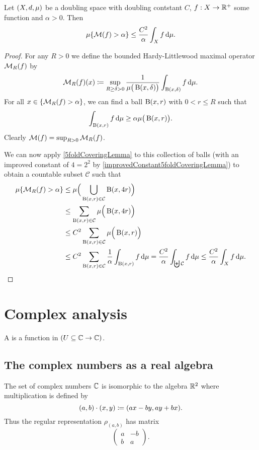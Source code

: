 \begin{proposition}
Let $\left( X,d, \mu \right)$ be a doubling space with doubling contstant $C$, $f: X\to \mathbb{R}^+$ some function and $\alpha > 0$. Then
\[ \mu\{\operatorname{\mathcal{M}}(f) > \alpha\} \leq \frac{C^2}{\alpha}\int_{X}f\operatorname{d \!}{\mu}. \]
\end{proposition}
\begin{proof}
For any $R>0$ we define the bounded Hardy-Littlewood maximal operator $\operatorname{\mathcal{M}}_R(f)$ by
\[ \operatorname{\mathcal{M}}_R(f)(x) \coloneqq \sup_{R\geq\delta >0}\frac{1}{\mu\big(\operatorname{B}(x,\delta)\big)}\int_{\operatorname{B}(x,\delta)} f \operatorname{d \!}{\mu}. \]
For all $x\in \{\operatorname{\mathcal{M}}_R(f) > \alpha\}$, we can find a ball $\operatorname{B}(x,r)$ with $0<r\leq R$ such that
\[ \int_{\operatorname{B}(x,r)}f \operatorname{d \!}{\mu} \geq \alpha\mu\big(\operatorname{B}(x,r)\big). \]
Clearly $\operatorname{\mathcal{M}}(f) = \sup_{R>0}\operatorname{\mathcal{M}}_R(f)$.

We can now apply \ref{5foldCoveringLemma} to this collection of balls (with an improved constant of $4 = 2^2$ by \ref{improvedConstant5foldCoveringLemma}) to obtain a countable subset $\mathcal{C}$ such that
\begin{align*}
\mu\{\operatorname{\mathcal{M}}_R(f) > \alpha\} &\leq \mu\Big(\bigcup_{\operatorname{B}(x,r)\in \mathcal{C}}\operatorname{B}(x,4r)\Big) \\
&\leq \sum_{\operatorname{B}(x,r)\in \mathcal{C}}\mu\Big(\operatorname{B}(x,4r)\Big) \\
&\leq C^2\sum_{\operatorname{B}(x,r)\in \mathcal{C}}\mu\Big(\operatorname{B}(x,r)\Big) \\
&\leq C^2\sum_{\operatorname{B}(x,r)\in \mathcal{C}}\frac{1}{\alpha}\int_{\operatorname{B}(x,r)}f \operatorname{d \!}{\mu} = \frac{C^2}{\alpha}\int_{\biguplus \mathcal{C}} f \operatorname{d \!}{\mu} \leq \frac{C^2}{\alpha}\int_{X} f \operatorname{d \!}{\mu}.
\end{align*} 



\end{proof}
\begin{corollary}

\end{corollary}




\chapter{Complex analysis}
\begin{definition}
A  is a function in $(U\subseteq \mathbb{C} \to \mathbb{C})$.
\end{definition}
\section{The complex numbers as a real algebra}
The set of complex numbers $\mathbb{C}$ is isomorphic to the algebra $\mathbb{R}^2$ where multiplication is defined by
\[ (a, b)\cdot (x, y) \coloneqq (ax-by, ay+bx). \]
Thus the regular representation $\rho_{(a,b)}$ has matrix
\[ \begin{pmatrix}
a & -b \\ b & a
\end{pmatrix}. \]

